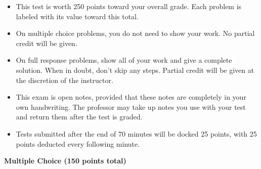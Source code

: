 \documentclass[12pt]{exam}
\newcommand{\<}{\langle}
\renewcommand{\>}{\rangle}
\begin{document}
\begin{center}
\end{center}
\vspace{0.1in}

\vspace{12pt}

\begin{itemize}
  \item This test is worth 250 points toward your overall grade.
        Each problem is labeled with its value toward this total.
  \item On multiple choice problems, you do not need to show your work. No
        partial credit will be given.
  \item On full response problems, show all of your work and give a
        complete solution. When in doubt, don't skip any steps. Partial
        credit will be given at the discretion of the instructor.
  \item This exam is open notes, provided that these notes are completely
        in your own handwriting. The professor may take up notes you use
        with your test and return them after the test is graded.
  \item Tests submitted after the end of 70 minutes will be docked 25 points,
        with 25 points deducted every following minute.
\end{itemize}

\newpage

\begin{center}
  \textbf{Multiple Choice (150 points total)}
\end{center}
\end{document}
